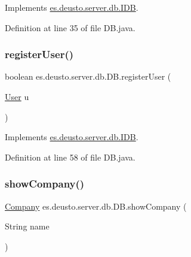 Implements \hyperlink{interfacees_1_1deusto_1_1server_1_1db_1_1_i_d_b_ac5ef9780a640140576f9373f8b57631c}{es.\+deusto.\+server.\+db.\+I\+DB}.



Definition at line 35 of file D\+B.\+java.

\mbox{\label{classes_1_1deusto_1_1server_1_1db_1_1_d_b_a888f468b3fc2a05520fca9ac135823e3}} 
\subsubsection{\texorpdfstring{register\+User()}{registerUser()}}
{\footnotesize\ttfamily boolean es.\+deusto.\+server.\+db.\+D\+B.\+register\+User (\begin{DoxyParamCaption}\item[{\hyperlink{classes_1_1deusto_1_1server_1_1db_1_1data_1_1_user}{User}}]{u }\end{DoxyParamCaption})}



Implements \hyperlink{interfacees_1_1deusto_1_1server_1_1db_1_1_i_d_b_ad9ecf628cb97ade7cb1b10fd1b3a18c4}{es.\+deusto.\+server.\+db.\+I\+DB}.



Definition at line 58 of file D\+B.\+java.

\mbox{\label{classes_1_1deusto_1_1server_1_1db_1_1_d_b_ab5edf3ae158bb0501a882b1d724cc2a8}} 
\subsubsection{\texorpdfstring{show\+Company()}{showCompany()}}
{\footnotesize\ttfamily \hyperlink{classes_1_1deusto_1_1server_1_1db_1_1data_1_1_company}{Company} es.\+deusto.\+server.\+db.\+D\+B.\+show\+Company (\begin{DoxyParamCaption}\item[{String}]{name }\end{DoxyParamCaption})}



